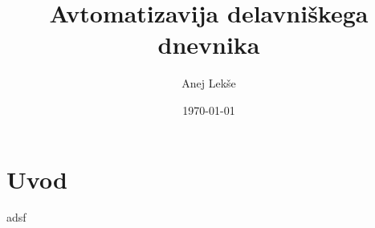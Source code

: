 \documentclass[12pt, a4paper, twoside]{article}
\title{Avtomatizavija delavniškega dnevnika}
\author{Anej Lekše}
\date{\today}
\begin{document}
\maketitle

\newpage

\section{Uvod}

adsf
\end{document}
